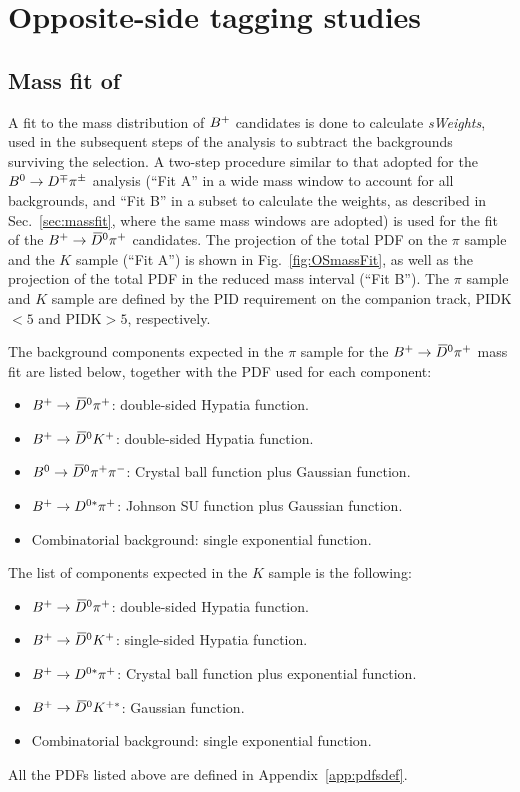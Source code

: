 \section{Opposite-side tagging studies}
\label{app:OS}

\subsection[Mass fit of $\Bp\to\Dzb\pip$]{Mass fit of \boldmath{$\Bp\to\Dzb\pip$}}
\label{app:OSmassFit}

A fit to the mass distribution of $B^+$ candidates is done to calculate \emph{sWeights},
used in the subsequent steps of the analysis to subtract the backgrounds surviving the selection.
A two-step procedure similar to that adopted for the $B^0\rightarrow D^\mp\pi^\pm$ analysis (``Fit A'' in a
wide mass window to account for all backgrounds, and ``Fit B'' in a subset to calculate the weights,
as described in Sec.~\ref{sec:massfit}, where the same mass windows are adopted) is used for the fit of the $\Bp\to\Dzb\pip$ candidates.
The projection of the total PDF on the $\pi$ sample and the $K$ sample (``Fit A'') is shown in
Fig.~\ref{fig:OSmassFit}, as well as the projection of the total PDF in the reduced mass interval (``Fit B'').
The $\pi$ sample and $K$ sample are defined by the PID requirement
on the companion track, PIDK$<5$ and PIDK$>5$, respectively.

The background components expected in the $\pi$ sample for the $\Bp\to\Dzb\pip$ mass fit are listed below,
together with the PDF used for each component:
\begin{itemize}[noitemsep,topsep=0pt]
  \item $\Bp\to\Dzb\pip$: double-sided Hypatia function.
  \item $B^+\rightarrow\kern 0.2em\overline{\kern -0.2em D}{}^0K^+$: double-sided Hypatia function.
  \item $B^0\rightarrow\kern 0.2em\overline{\kern -0.2em D}{}^0\pi^+\pi^-$: Crystal ball function plus Gaussian function.
  \item $B^+\rightarrow D^{0*}\pi^+$: Johnson SU function plus Gaussian function.
  \item Combinatorial background: single exponential function.  
\end{itemize}
The list of components expected in the $K$ sample is the following:
\begin{itemize}[noitemsep,topsep=0pt]
  \item $\Bp\to\Dzb\pip$: double-sided Hypatia function.
  \item $B^+\rightarrow\kern 0.2em\overline{\kern -0.2em D}{}^0K^+$: single-sided Hypatia function.
  \item $B^+\rightarrow D^{0*}\pi^+$: Crystal ball function plus exponential function.
  \item $B^+\rightarrow\kern 0.2em\overline{\kern -0.2em D}{}^0 K^{+*}$: Gaussian function.
  \item Combinatorial background: single exponential function.  
\end{itemize}
All the PDFs listed above are defined in Appendix~\ref{app:pdfsdef}. 

